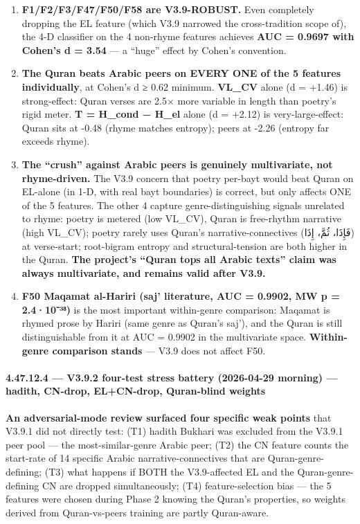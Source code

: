 \documentclass[
]{article}
\begin{document}
\begin{enumerate}
\def\labelenumi{\arabic{enumi}.}
\item
  \textbf{F1/F2/F3/F47/F50/F58 are V3.9-ROBUST.} Even completely
  dropping the EL feature (which V3.9 narrowed the cross-tradition scope
  of), the 4-D classifier on the 4 non-rhyme features achieves
  \textbf{AUC = 0.9697 with Cohen's d = 3.54} --- a ``huge'' effect by
  Cohen's convention.
\item
  \textbf{The Quran beats Arabic peers on EVERY ONE of the 5 features
  individually}, at Cohen's d ≥ 0.62 minimum. \textbf{VL\_CV} alone (d =
  +1.46) is strong-effect: Quran verses are 2.5× more variable in length
  than poetry's rigid meter. \textbf{T = H\_cond − H\_el} alone (d =
  +2.12) is very-large-effect: Quran sits at -0.48 (rhyme matches
  entropy); peers at -2.26 (entropy far exceeds rhyme).
\item
  \textbf{The ``crush'' against Arabic peers is genuinely multivariate,
  not rhyme-driven.} The V3.9 concern that poetry per-bayt would beat
  Quran on EL-alone (in 1-D, with real bayt boundaries) is correct, but
  only affects ONE of the 5 features. The other 4 capture
  genre-distinguishing signals unrelated to rhyme: poetry is metered
  (low VL\_CV), Quran is free-rhythm narrative (high VL\_CV); poetry
  rarely uses Quran's narrative-connectives (فَإِذَا، ثُمَّ، إِذَا) at
  verse-start; root-bigram entropy and structural-tension are both
  higher in the Quran. \textbf{The project's ``Quran tops all Arabic
  texts'' claim was always multivariate, and remains valid after V3.9.}
\item
  \textbf{F50 Maqamat al-Hariri (saj' literature, AUC = 0.9902, MW p =
  2.4·10⁻³⁸)} is the most important within-genre comparison: Maqamat is
  rhymed prose by Hariri (same genre as Quran's saj'), and the Quran is
  still distinguishable from it at AUC = 0.9902 in the multivariate
  space. \textbf{Within-genre comparison stands} --- V3.9 does not
  affect F50.
\end{enumerate}

\paragraph{4.47.12.4 --- V3.9.2 four-test stress battery (2026-04-29
morning) --- hadith, CN-drop, EL+CN-drop, Quran-blind
weights}\label{v3.9.2-four-test-stress-battery-2026-04-29-morning-hadith-cn-drop-elcn-drop-quran-blind-weights}

\textbf{An adversarial-mode review surfaced four specific weak points}
that V3.9.1 did not directly test: (T1) hadith Bukhari was excluded from
the V3.9.1 peer pool --- the most-similar-genre Arabic peer; (T2) the CN
feature counts the start-rate of 14 specific Arabic
narrative-connectives that are Quran-genre-defining; (T3) what happens
if BOTH the V3.9-affected EL and the Quran-genre-defining CN are dropped
simultaneously; (T4) feature-selection bias --- the 5 features were
chosen during Phase 2 knowing the Quran's properties, so weights derived
from Quran-vs-peers training are partly Quran-aware.
\end{document}
